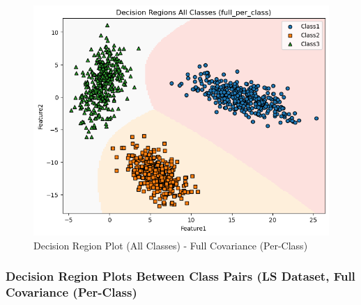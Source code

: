 \begin{figure}[H]
    \centering
    \includegraphics[width=\linewidth]{images/LS_Group04_images/04_full_per_class/05_decision_region_all.png}
    \caption{Decision Region Plot (All Classes) - Full Covariance (Per-Class)}
\end{figure}

\subsubsection{Decision Region Plots Between Class Pairs (LS Dataset, Full Covariance (Per-Class)}

